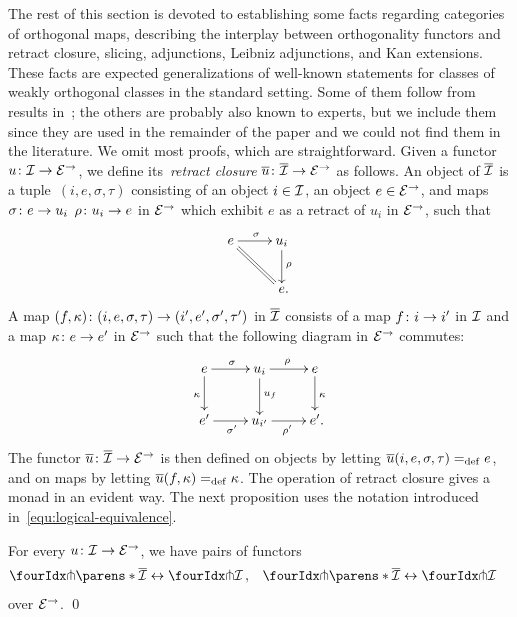 \documentclass[reqno,10pt,a4paper,oneside,draft]{amsart}
\begin{document}
{{The rest of this section is devoted to establishing some facts regarding categories of orthogonal maps, describing the interplay between orthogonality functors and retract closure, slicing, adjunctions, Leibniz adjunctions, and Kan extensions.
These facts are expected generalizations of well-known statements for classes of weakly orthogonal classes in the standard setting. 
Some of them follow from results in~\cite{bourke-garner-I}; the others are probably also known to experts, but we include them since they are used in the remainder of the paper and we could not find them in the literature.
We omit most proofs, which are straightforward. 
Given a functor $u \co \cal{I} \to \calE^\to$, we define its~\emph{retract closure} $\overline{u} \co \overline{\cal{I}} \to \catE^\to$ as follows.
An object of $\overline{\cal{I}}$ is a tuple~$(i, e, \sigma, \tau)$ consisting of an object $i \in \cal{I}$, an object $e \in \catE^\to$, and maps $\sigma \co e \rightarrow u_i$ $\rho \co u_i \rightarrow e$ in $\catE^\to$ which exhibit $e$ as a retract of $u_i$ in $\catE^\to$, \ie such that
\[
\xymatrix{
  e
  \ar[r]^{\sigma}
  \ar@{=}[dr]
&
  u_i
  \ar[d]^{\rho}
\\&
  e
\rlap{.}}
\]
A map $(f, \kappa) \co (i, e, \sigma, \tau) \to (i', e', \sigma', \tau')$ in $\overline{\cal{I}}$ consists of a map $f \co i \to i'$ in $\cal{I}$ and a map $\kappa \co e \rightarrow e'$ in $\catE^\to$ such that the following diagram in $\catE^\to$ commutes:
\[
\xymatrix{
  e
  \ar[r]^{\sigma}
  \ar[d]_{\kappa}
&
  u_i
  \ar[r]^{\rho}
  \ar[d]^{u_f}
&
  e
  \ar[d]^{\kappa}
\\
  e'
  \ar[r]_{\sigma'}
&
  u_{i'}
  \ar[r]_{\rho'}
&
  e'
\rlap{.}}
\]
The functor $\overline{u} \co \overline{\cal{I}} \to \catE^\to$ is then defined on objects by letting $\overline{u}(i, e, \sigma, \tau) \defeq e$, and on maps by letting $\overline{u}(f, \kappa) \defeq \kappa$.
The operation of retract closure gives a monad in an evident way.
The next proposition uses the notation introduced in~\eqref{equ:logical-equivalence}.

\begin{proposition} \label{retract-closure}
For every $u \co \cal{I} \to \catE^\to$, we have pairs of functors
\[
\begin{aligned}
  \liftr{\parens*{\overline{\cal{I}}}} &\leftrightarrow \liftr{\cal{I}}
\, ,&
  \liftl{\parens*{\overline{\cal{I}}}} &\leftrightarrow \liftl{\cal{I}}
\end{aligned}
\]
over $\catE^\to$.
\qed
\end{proposition}

}}
\end{document}
